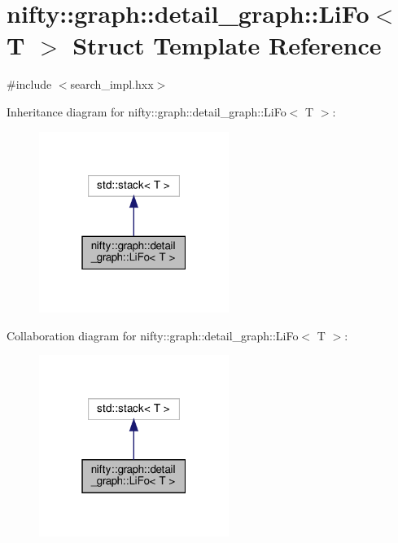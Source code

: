 \hypertarget{structnifty_1_1graph_1_1detail__graph_1_1LiFo}{}\section{nifty\+:\+:graph\+:\+:detail\+\_\+graph\+:\+:Li\+Fo$<$ T $>$ Struct Template Reference}
\label{structnifty_1_1graph_1_1detail__graph_1_1LiFo}


{\ttfamily \#include $<$search\+\_\+impl.\+hxx$>$}



Inheritance diagram for nifty\+:\+:graph\+:\+:detail\+\_\+graph\+:\+:Li\+Fo$<$ T $>$\+:
\nopagebreak
\begin{figure}[H]
\begin{center}
\leavevmode
\includegraphics[width=175pt]{structnifty_1_1graph_1_1detail__graph_1_1LiFo__inherit__graph}
\end{center}
\end{figure}


Collaboration diagram for nifty\+:\+:graph\+:\+:detail\+\_\+graph\+:\+:Li\+Fo$<$ T $>$\+:
\nopagebreak
\begin{figure}[H]
\begin{center}
\leavevmode
\includegraphics[width=175pt]{structnifty_1_1graph_1_1detail__graph_1_1LiFo__coll__graph}
\end{center}
\end{figure}
